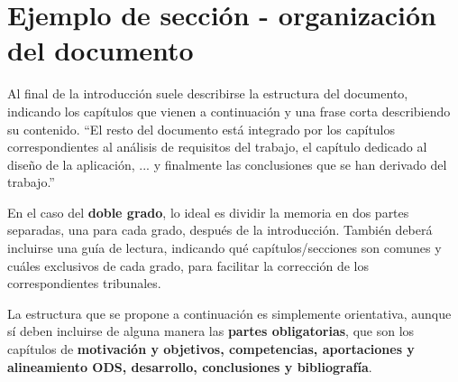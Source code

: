 \section{Ejemplo de sección - organización del documento}

Al final de la introducción suele describirse la estructura del documento, indicando los capítulos que vienen a continuación y una frase corta describiendo su contenido. ``El resto del documento está integrado por los capítulos correspondientes al análisis de requisitos del trabajo, el capítulo dedicado al diseño de la aplicación, ... y finalmente las conclusiones que se han derivado del trabajo.''

En el caso del \textbf{doble grado}, lo ideal es dividir la memoria en dos partes separadas, una para cada grado, después de la introducción. También deberá incluirse una guía de lectura, indicando qué capítulos/secciones son comunes y cuáles exclusivos de cada grado, para facilitar la corrección de los correspondientes tribunales.

La estructura que se propone a continuación es simplemente orientativa, aunque sí deben incluirse de alguna manera las \textbf{partes obligatorias}, que son los capítulos de \textbf{motivación y objetivos, competencias, aportaciones y alineamiento ODS, desarrollo, conclusiones y bibliografía}.

